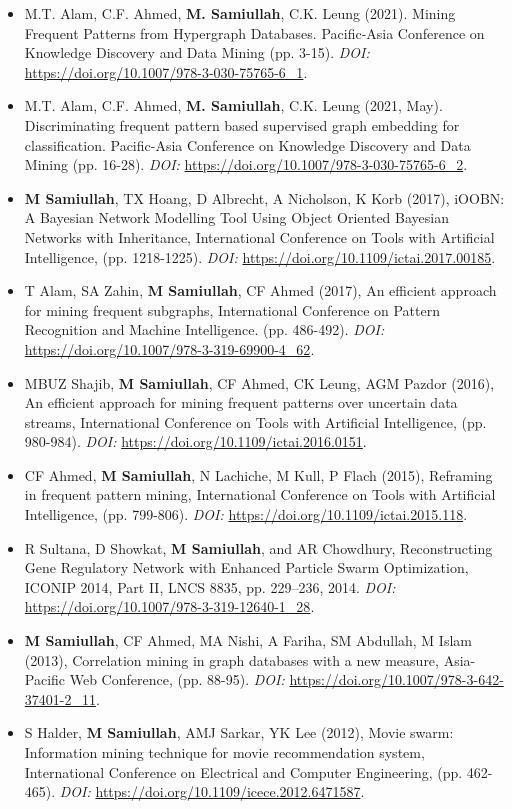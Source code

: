 \begin{itemize}[noitemsep]
    \item M.T. Alam, C.F. Ahmed, \textbf{M. Samiullah}, C.K. Leung (2021). Mining Frequent Patterns from Hypergraph Databases. Pacific-Asia Conference on Knowledge Discovery and Data Mining (pp. 3-15). {\em DOI:} \url{https://doi.org/10.1007/978-3-030-75765-6_1}.
    \item M.T. Alam, C.F. Ahmed, \textbf{M. Samiullah}, C.K. Leung (2021, May). Discriminating frequent pattern based supervised graph embedding for classification. Pacific-Asia Conference on Knowledge Discovery and Data Mining (pp. 16-28). {\em DOI:} \url{https://doi.org/10.1007/978-3-030-75765-6_2}.
    \item \textbf{M Samiullah}, TX Hoang, D Albrecht, A Nicholson, K Korb (2017), iOOBN: A Bayesian Network Modelling Tool Using Object Oriented Bayesian Networks with Inheritance, International Conference on Tools with Artificial Intelligence, (pp. 1218-1225). {\em DOI:} \url{https://doi.org/10.1109/ictai.2017.00185}.
    \item T Alam, SA Zahin, {\bf M Samiullah}, CF Ahmed (2017), An efficient approach for mining frequent subgraphs, International Conference on Pattern Recognition and Machine Intelligence. (pp. 486-492). {\em DOI:} \url{https://doi.org/10.1007/978-3-319-69900-4_62}.
    \item MBUZ Shajib, {\bf M Samiullah}, CF Ahmed, CK Leung, AGM Pazdor (2016), An efficient approach for mining frequent patterns over uncertain data streams, International Conference on Tools with Artificial Intelligence, (pp. 980-984). {\em DOI:} \url{https://doi.org/10.1109/ictai.2016.0151}.
    \item CF Ahmed, {\bf M Samiullah}, N Lachiche, M Kull, P Flach (2015), Reframing in frequent pattern mining, International Conference on Tools with Artificial Intelligence, (pp. 799-806). {\em DOI:} \url{https://doi.org/10.1109/ictai.2015.118}.
    \item R Sultana, D Showkat, \textbf{M Samiullah}, and AR Chowdhury, Reconstructing Gene Regulatory Network with Enhanced Particle Swarm Optimization, ICONIP 2014, Part II, LNCS 8835, pp. 229–236, 2014. {\em DOI:} \url{https://doi.org/10.1007/978-3-319-12640-1_28}.
    \item {\bf M Samiullah}, CF Ahmed, MA Nishi, A Fariha, SM Abdullah, M Islam (2013), Correlation mining in graph databases with a new measure, Asia-Pacific Web Conference, (pp. 88-95). {\em DOI:} \url{https://doi.org/10.1007/978-3-642-37401-2_11}.
    \item S Halder, {\bf M Samiullah}, AMJ Sarkar, YK Lee (2012), Movie swarm: Information mining technique for movie recommendation system, International Conference on Electrical and Computer Engineering, (pp. 462-465). {\em DOI:} \url{https://doi.org/10.1109/icece.2012.6471587}.

\end{itemize}
